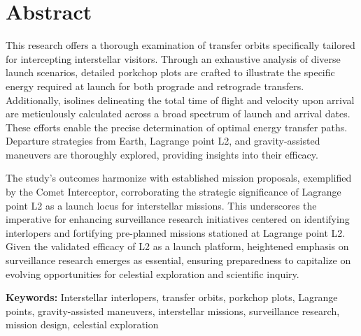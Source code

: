 \chapter*{Abstract}

This research offers a thorough examination of transfer orbits specifically
tailored for intercepting interstellar visitors. Through an exhaustive analysis
of diverse launch scenarios, detailed porkchop plots are crafted to illustrate
the specific energy required at launch for both prograde and retrograde
transfers. Additionally, isolines delineating the total time of flight and
velocity upon arrival are meticulously calculated across a broad spectrum of
launch and arrival dates. These efforts enable the precise determination of
optimal energy transfer paths. Departure strategies from Earth, Lagrange point
L2, and gravity-assisted maneuvers are thoroughly explored, providing insights
into their efficacy.

The study's outcomes harmonize with established mission proposals, exemplified
by the Comet Interceptor, corroborating the strategic significance of Lagrange
point L2 as a launch locus for interstellar missions. This underscores the
imperative for enhancing surveillance research initiatives centered on
identifying interlopers and fortifying pre-planned missions stationed at
Lagrange point L2. Given the validated efficacy of L2 as a launch platform,
heightened emphasis on surveillance research emerges as essential, ensuring
preparedness to capitalize on evolving opportunities for celestial exploration
and scientific inquiry.


\vspace{4cm}
\textbf{Keywords:} Interstellar interlopers, transfer orbits, porkchop plots, Lagrange points,
gravity-assisted maneuvers, interstellar missions, surveillance research,
mission design, celestial exploration

